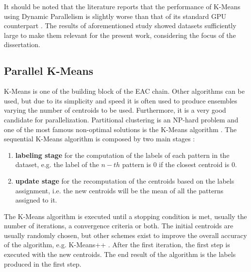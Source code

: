 It should be noted that the literature reports that the performance of K-Means using Dynamic Parallelism is slightly worse than that of its standard GPU counterpart \cite{DiMarco2013}.
The results of aforementioned study showed datasets sufficiently large to make them relevant for the present work, considering the focus of the dissertation. 

\subsection{Parallel K-Means}

K-Means is one of the building block of the EAC chain.
Other algorithms can be used, but due to its simplicity and speed it is often used to produce ensembles varying the number of centroids to be used.
Furthermore, it is a very good candidate for parallelization.
Partitional clustering is an NP-hard problem and one of the most famous non-optimal solutions is the K-Means algorithm \cite{kmeansoriginal}.
The sequential K-Means algorithm is composed by two main stages \cite{Jain2010}:

\begin{enumerate}
	\item \textbf{labeling stage} for the computation of the labels of each pattern in the dataset, e.g. the label of the $n-th$ pattern is $0$ if the closest centroid is $0$.
	\item \textbf{update stage} for the recomputation of the centroids based on the labels assignment, i.e. the new centroids will be the mean of all the patterns assigned to it.
\end{enumerate}

The K-Means algorithm is executed until a stopping condition is met, usually the number of iterations, a convergence criteria or both.
The initial centroids are usually randomly chosen, but other schemes exist to improve the overall accuracy of the algorithm, e.g. K-Means++ \cite{Arthur2007}.
After the first iteration, the first step is executed with the new centroids.
The end result of the algorithm is the labels produced in the first step.

